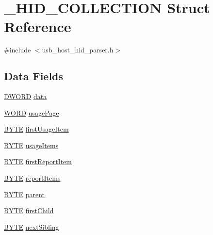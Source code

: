 \hypertarget{struct___h_i_d___c_o_l_l_e_c_t_i_o_n}{}\section{\+\_\+\+H\+I\+D\+\_\+\+C\+O\+L\+L\+E\+C\+T\+I\+O\+N Struct Reference}
\label{struct___h_i_d___c_o_l_l_e_c_t_i_o_n}


{\ttfamily \#include $<$usb\+\_\+host\+\_\+hid\+\_\+parser.\+h$>$}

\subsection*{Data Fields}
\begin{DoxyCompactItemize}
\item 
\hyperlink{_generic_type_defs_8h_ad342ac907eb044443153a22f964bf0af}{D\+W\+O\+R\+D} \hyperlink{struct___h_i_d___c_o_l_l_e_c_t_i_o_n_a93725455c265ad9e4e156050f329ee97}{data}
\item 
\hyperlink{_generic_type_defs_8h_a2b0e863dadf920709ec53d9088ee7c91}{W\+O\+R\+D} \hyperlink{struct___h_i_d___c_o_l_l_e_c_t_i_o_n_aa44ef18c8cbb507831398f1e85c62d0b}{usage\+Page}
\item 
\hyperlink{_generic_type_defs_8h_a4ae1dab0fb4b072a66584546209e7d58}{B\+Y\+T\+E} \hyperlink{struct___h_i_d___c_o_l_l_e_c_t_i_o_n_a6857bcbd27579a48266437e596c00058}{first\+Usage\+Item}
\item 
\hyperlink{_generic_type_defs_8h_a4ae1dab0fb4b072a66584546209e7d58}{B\+Y\+T\+E} \hyperlink{struct___h_i_d___c_o_l_l_e_c_t_i_o_n_ae443eb226a165cd8e906d6135bf3c0e8}{usage\+Items}
\item 
\hyperlink{_generic_type_defs_8h_a4ae1dab0fb4b072a66584546209e7d58}{B\+Y\+T\+E} \hyperlink{struct___h_i_d___c_o_l_l_e_c_t_i_o_n_ab958bc85f06e824839ee9be7fcfb8038}{first\+Report\+Item}
\item 
\hyperlink{_generic_type_defs_8h_a4ae1dab0fb4b072a66584546209e7d58}{B\+Y\+T\+E} \hyperlink{struct___h_i_d___c_o_l_l_e_c_t_i_o_n_a0540b939f53782aefe3dcf1f653ab13f}{report\+Items}
\item 
\hyperlink{_generic_type_defs_8h_a4ae1dab0fb4b072a66584546209e7d58}{B\+Y\+T\+E} \hyperlink{struct___h_i_d___c_o_l_l_e_c_t_i_o_n_a00ebc533f337e8fb72c2f4261566bca2}{parent}
\item 
\hyperlink{_generic_type_defs_8h_a4ae1dab0fb4b072a66584546209e7d58}{B\+Y\+T\+E} \hyperlink{struct___h_i_d___c_o_l_l_e_c_t_i_o_n_aa37b74dff61cb90f2a7040021a3afd89}{first\+Child}
\item 
\hyperlink{_generic_type_defs_8h_a4ae1dab0fb4b072a66584546209e7d58}{B\+Y\+T\+E} \hyperlink{struct___h_i_d___c_o_l_l_e_c_t_i_o_n_a3fad0c4605a8563a5b37af444df01d74}{next\+Sibling}
\end{DoxyCompactItemize}


